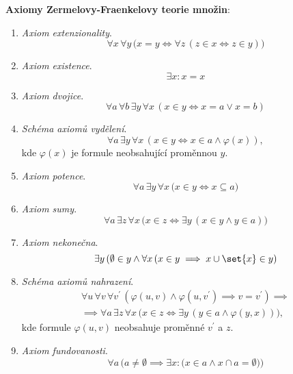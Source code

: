 \noindent\textbf{Axiomy Zermelovy-Fraenkelovy teorie množin}:
\begin{enumerate}[label=({\textsf{ZF}}\arabic*)]
    \item\label{item:axiom_extenzionality} \emph{Axiom extenzionality}.
    \begin{equation*}
        \forall x\,\forall y\,\big(x=y \iff \forall z\,(z\in x \iff z\in y)\big)
    \end{equation*}
    \item\label{item:axiom_existence} \emph{Axiom existence}.
    \begin{equation*}
        \exists x: x=x
    \end{equation*}
    \item\label{item:axiom_dvojice} \emph{Axiom dvojice}.
    \begin{equation*}
        \forall a\,\forall b\,\exists y\,\forall x\,(x \in y \iff x=a \lor x=b)
    \end{equation*}
    \item\label{item:schema_axiomu_vydeleni} \emph{Schéma axiomů vydělení}.
    \begin{equation*}
        \forall a\,\exists y\,\forall x\,(x\in y \iff x\in a \land \varphi(x)),
    \end{equation*}
    kde $\varphi(x)$ je formule neobsahující proměnnou $y$.
    \item\label{item:axiom_potence} \emph{Axiom potence}.
    \begin{equation*}
        \forall a\,\exists y\,\forall x\,\big(x\in y \iff x\subseteq a\big)
    \end{equation*}
    \item\label{item:axiom_sumy} \emph{Axiom sumy}.
    \begin{equation*}
        \forall a\,\exists z\,\forall x\,\big(x\in z\iff \exists y\,(x\in y \land y\in a)\big)
    \end{equation*}
    \item\label{item:axiom_nekonecna} \emph{Axiom nekonečna}.
    \begin{equation*}
        \exists y\, (\emptyset\in y \land \forall x\,(x\in y\implies x\cup\set{x}\in y)
    \end{equation*}
    \item\label{item:schema_axiomu_nahrazeni} \emph{Schéma axiomů nahrazení}.
    \begin{align*}
        \forall u\,\forall v\,\forall v^\prime\,(\varphi(u,v) \land \varphi(u,v^\prime) \implies v=v^\prime)\implies\\ \implies \forall a\,\exists z\,\forall x\,\big(x\in z \iff \exists y\,(y\in a \land \varphi(y,x))\big),
    \end{align*}
    kde formule $\varphi(u,v)$ neobsahuje proměnné $v^\prime$ a $z$.
    \item\label{item:axiom_fundovanosti} \emph{Axiom fundovanosti}.
    \begin{equation*}
        \forall a\,\Big(a\neq\emptyset \implies \exists x:\big(x\in a \land x\cap a=\emptyset\big)\Big)
    \end{equation*}
\end{enumerate}
